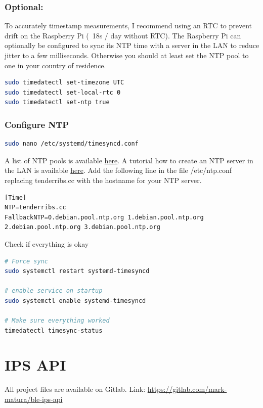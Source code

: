 \documentclass[a4paper, oneside]{ipsreport}
\begin{document}
\subsubsection*{Optional:}
To accurately timestamp measurements, I recommend using an RTC to prevent drift on the Raspberry Pi (~18s / day without RTC). The Raspberry Pi can optionally be configured to sync its NTP time with a server in the LAN to reduce jitter to a few milliseconds. Otherwise you should at least set the NTP pool to one in your country of residence.

\begin{lstlisting}[language=bash]
sudo timedatectl set-timezone UTC
sudo timedatectl set-local-rtc 0
sudo timedatectl set-ntp true
\end{lstlisting}

\subsubsection*{Configure NTP}
\begin{lstlisting}[language=bash]
sudo nano /etc/systemd/timesyncd.conf
\end{lstlisting}

A list of NTP pools is available \href{https://www.pool.ntp.org/zone/ch}{here}. A tutorial how to create an NTP server in the LAN is available \href{https://vitux.com/how-to-install-ntp-server-and-client-on-ubuntu/}{here}. Add the following line in the file /etc/ntp.conf replacing tenderribs.cc with the hostname for your NTP server.
\begin{lstlisting}
[Time]
NTP=tenderribs.cc
FallbackNTP=0.debian.pool.ntp.org 1.debian.pool.ntp.org 2.debian.pool.ntp.org 3.debian.pool.ntp.org
\end{lstlisting}

Check if everything is okay

\begin{lstlisting}[language=bash]
# Force sync
sudo systemctl restart systemd-timesyncd

# enable service on startup
sudo systemctl enable systemd-timesyncd

# Make sure everything worked
timedatectl timesync-status
\end{lstlisting}

\section{IPS API}
\label{installationguide:ipsapi}
All project files are available on Gitlab. Link: \href{https://gitlab.com/mark-matura/ble-ips-api}{https://gitlab.com/mark-matura/ble-ips-api}
\end{document}
